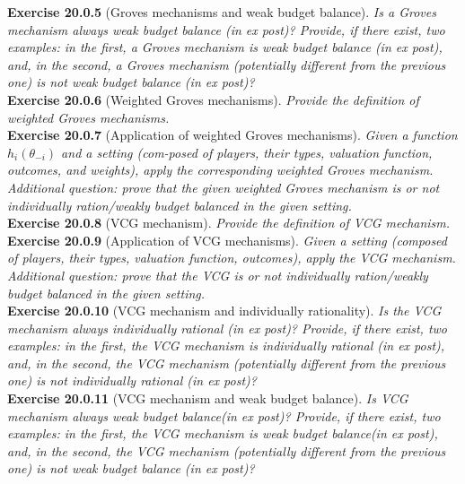 \textbf{Exercise 20.0.5} (Groves mechanisms and weak budget balance). \textit{Is a Groves mechanism always weak budget balance (in ex post)? Provide, if there exist, two examples: in the first, a Groves mechanism is weak budget balance (in ex post), and, in the second, a Groves mechanism (potentially different from the previous one) is not weak budget balance (in ex post)?}\\

\textbf{Exercise 20.0.6} (Weighted Groves mechanisms). \textit{Provide the definition of weighted Groves mechanisms.}\\

\textbf{Exercise 20.0.7} (Application of weighted Groves mechanisms). \textit{Given a function $h_i (\theta_{-i})$ and a setting (com-posed of players, their types, valuation function, outcomes, and weights), apply the corresponding weighted Groves mechanism. Additional question: prove that the given weighted Groves mechanism is or not individually ration/weakly budget balanced in the given setting.}\\

\textbf{Exercise 20.0.8} (VCG mechanism). \textit{Provide the definition of VCG mechanism.}\\

\textbf{Exercise 20.0.9} (Application of VCG mechanisms). \textit{Given a setting (composed of players, their types, valuation function, outcomes), apply the VCG mechanism. Additional question: prove that the VCG is or not individually ration/weakly budget balanced in the given setting.}\\

\textbf{Exercise 20.0.10} (VCG mechanism and individually rationality). \textit{Is the VCG mechanism always individually rational (in ex post)? Provide, if there exist, two examples: in the first, the VCG mechanism is individually rational (in ex post), and, in the second, the VCG mechanism (potentially different from the previous one) is not individually rational (in ex post)?}\\

\textbf{Exercise 20.0.11} (VCG mechanism and weak budget balance). \textit{Is VCG mechanism always weak budget balance(in ex post)? Provide, if there exist, two examples: in the first, the VCG mechanism is weak budget balance(in ex post), and, in the second, the VCG mechanism (potentially different from the previous one) is not weak budget balance (in ex post)?}\\

